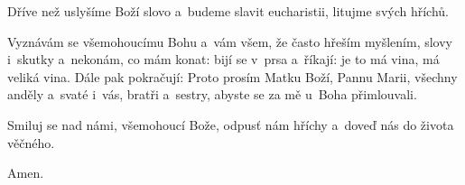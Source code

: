 \Vbardot{} Dříve než uslyšíme Boží slovo a~budeme slavit eucharistii, litujme svých hříchů.

Vyznávám se všemohoucímu Bohu a~vám všem, že často hřeším myšlením, slovy
i~skutky a~nekonám, co mám konat: bijí se v~prsa a~říkají: je to má vina, má
veliká vina. Dále pak pokračují: Proto prosím Matku Boží, Pannu Marii,
všechny anděly a~svaté i~vás, bratři a~sestry, abyste se za mě u~Boha
přimlouvali.

\Vbardot{} Smiluj se nad námi, všemohoucí Bože, odpusť nám hříchy a~doveď nás do života věčného.

\Rbardot{} Amen.
